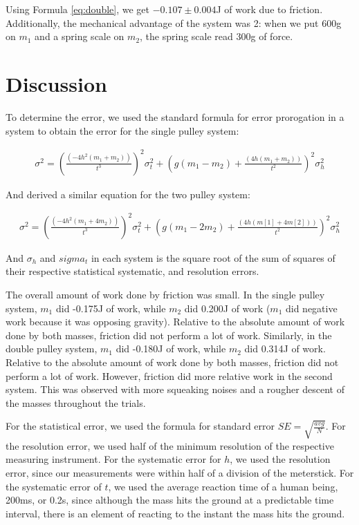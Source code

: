 \documentclass[12pt]{article}
\begin{document}
Using Formula \ref{eq:double}, we get \(-0.107 \pm 0.004\)J of work due to friction. Additionally, the mechanical advantage of the system was 2: when we put 600g on \(m_1\) and a spring scale on \(m_2\), the spring scale read 300g of force.
\section{Discussion}
\label{sec:orga096833}

To determine the error, we used the standard formula for error prorogation in a system to obtain the error for the single pulley system:

\begin{align}
\sigma^2 = \left( \frac{(-4 h^2 (m_1 + m_2))}{t^3} \right)^2 \sigma_t^2 + \left( g (m_1 - m_2) + \frac{(4 h (m_1 + m_2))}{t^2} \right) ^2 \sigma_h^2
\end{align}

And derived a similar equation for the two pulley system:

\begin{align}
\sigma^2 = \left( \frac{(-4 h^2 (m_1 + 4 m_2))}{t^3} \right) ^2 \sigma_t^2 + \left( g (m_1 - 2 m_2) + \frac{(4 h (m[1] + 4 m[2]))}{t^2} \right)^2 \sigma_h^2
\end{align}

And \(\sigma_h\) and \(sigma_t\) in each system is the square root of the sum of squares of their respective statistical systematic, and resolution errors.

The overall amount of work done by friction was small. In the single pulley system, \(m_1\) did -0.175J of work, while \(m_2\) did 0.200J of work (\(m_1\) did negative work because it was opposing gravity). Relative to the absolute amount of work done by both masses, friction did not perform a lot of work. Similarly, in the double pulley system, \(m_1\) did -0.180J of work, while \(m_2\) did 0.314J of work. Relative to the absolute amount of work done by both masses, friction did not perform a lot of work. However, friction did more relative work in the second system. This was observed with more squeaking noises and a rougher descent of the masses throughout the trials.

For the statistical error, we used the formula for standard error \(SE = \sqrt{\frac{avg}{N}}\). For the resolution error, we used half of the minimum resolution of the respective measuring instrument. For the systematic error for \(h\), we used the resolution error, since our measurements were within half of a division of the meterstick. For the systematic error of \(t\), we used the average reaction time of a human being, 200ms, or 0.2s, since although the mass hits the ground at a predictable time interval, there is an element of reacting to the instant the mass hits the ground.
\end{document}
